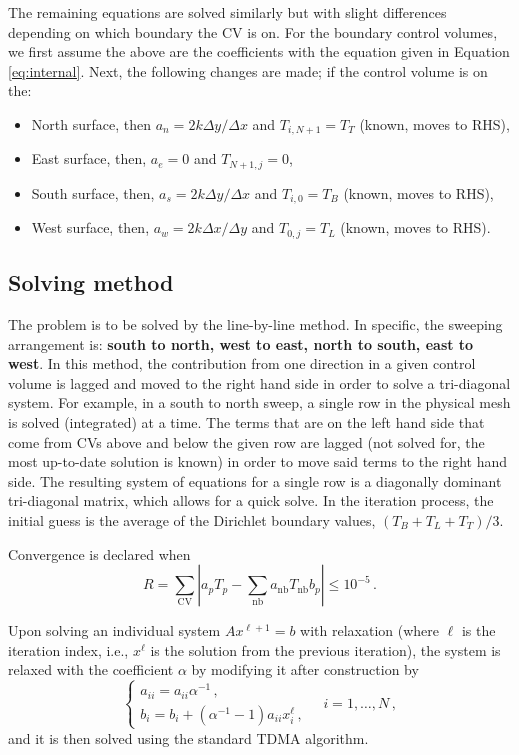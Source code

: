 \documentclass{article}
\begin{document}
The remaining equations are solved similarly but with slight differences depending on which boundary the CV is on. For the boundary control volumes, we first assume the above are the coefficients with the equation given in Equation \eqref{eq:internal}. Next, the following changes are made; if the control volume is on the:
\begin{itemize}
	\item North surface, then $a_n = 2k \Delta  y / \Delta x$ and $T_{i, N+1} = T_T$ (known, moves to RHS),
	\item East surface, then, $a_e = 0$ and $T_{N+1, j} = 0$,
	\item South surface, then, $a_s = 2k \Delta y / \Delta x$ and $T_{i, 0} = T_B$ (known, moves to RHS),
	\item West surface, then, $a_w = 2 k \Delta x / \Delta  y$ and $T_{0, j} = T_L$ (known, moves to RHS).
\end{itemize}

\subsection*{Solving method}

The problem is to be solved by the line-by-line method. In specific, the sweeping arrangement is: \textbf{south to north, west to east, north to south, east to west}. In this method, the contribution from one direction in a given control volume is lagged and moved to the right hand side in order to solve a tri-diagonal system. For example, in a south to north sweep, a single row in the physical mesh is solved (integrated) at a time. The terms that are on the left hand side that come from CVs above and below the given row are lagged (not solved for, the most up-to-date solution is known) in order to move said terms to the right hand side. The resulting system of equations for a single row is a diagonally dominant tri-diagonal matrix, which allows for a quick solve. In the iteration process, the initial guess is the average of the Dirichlet boundary values, $(T_B + T_L + T_T) / 3$.

Convergence is declared when
\begin{equation}
	R = \sum_\text{CV} \left| a_p T_p - \sum_{\text{nb}} a_\text{nb} T_\text{nb} b_p\right|\leq 10^{-5}\,.
\end{equation}

Upon solving an individual system $Ax^{\ell + 1} = b$ with relaxation (where $\ell$ is the iteration index, i.e., $x^\ell$ is the solution from the previous iteration), the system is relaxed with the coefficient $\alpha$ by modifying it after construction by
\[
	\begin{cases}
		a_{ii} = a_{ii} \alpha^{-1}\,,\\
		b_i = b_i + (\alpha^{-1} - 1) a_{ii} x_i^\ell\,,
	\end{cases} \quad i = 1, \ldots, N\,,
\]
and it is then solved using the standard TDMA algorithm.
\end{document}
